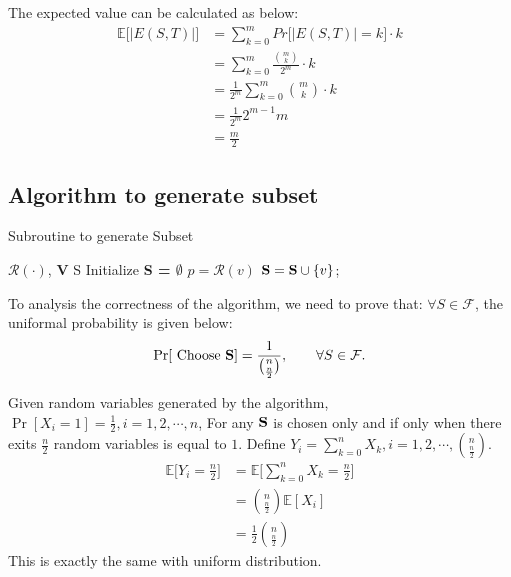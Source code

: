 \documentclass[a4paper, 12pt, titlepage]{article}
\begin{document}
The expected value can be calculated as below:
\begin{equation}
    \begin{aligned}
        \mathbb{E} \bigg[| E(S, T) | \bigg] &= \sum_{k = 0}^{m} Pr \big[ | E(S, T) | = k] \cdot k \\
                               &= \sum_{k = 0}^{m} \frac{\binom{m}{k}}{2^{m}} \cdot k  \\
                               &= \frac{1}{2^{m}} \sum_{k = 0}^{m} \binom{m}{k} \cdot k \\
                               &= \frac{1}{2^{m}} 2^{m - 1} m \\
                               &= \frac{m}{2}
    \end{aligned}
\end{equation}

\subsection{Algorithm to generate subset}

\begin{algorithm}[h]
    \caption{Subroutine to generate Subset}
    \begin{algorithmic}[1]
        \Require $\mathcal{R(\cdot)}$, {\bf V}
        \Ensure S
            \State Initialize {\bf S = $\emptyset$}
                    \State $ p = \mathcal R(v)$
                        \State ${\bf S} = {\bf S} \cup \{ v \}$;
                    \EndIf
                \EndFor
            \EndWhile
            \State {}
        \EndFunction
    \end{algorithmic}
\end{algorithm}


To analysis the correctness of the algorithm, we need to prove that:
$ \forall S \in \mathcal{F}$, the uniformal probability is given below:
\[
    \Pr [ \text{ Choose {\bf  S}} ] = \frac{1}{\binom{n}{\frac{n}{2}}}, \qquad \forall S \in \mathcal{F}.
\]

Given random variables generated by the algorithm, $\Pr [X_i = 1] = \frac{1}{2}, i = 1, 2, \cdots, n$, 
For any ${\bf S}$ is chosen only and if only when there exits $\frac{n}{2}$ random variables is equal to $1$.
Define $Y_i = \sum_{k = 0}^{n} X_{k}, i = 1, 2, \cdots, \binom{n}{\frac{n}{2}}$.
\begin{equation}
    \begin{aligned}
        \mathbb E \big[ Y_{i} = \frac{n}{2} \big] &= \mathbb E \big[ \sum_{k = 0}^{n} X_{k} = \frac{n}{2} \big] \\
                                                  &= \binom{n}{\frac{n}{2}} \mathbb E [X_i] \\
                                                  &= \frac{1}{2} \binom{n}{\frac{n}{2}} 
    \end{aligned}
\end{equation}
This is exactly the same with uniform distribution.
\end{document}
